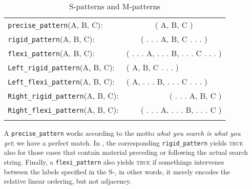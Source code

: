 \documentclass[output=paper,colorlinks,citecolor=brown,draft]{langscibook}
\begin{document}
\begin{table}
\caption{S-patterns and M-patterns }
\label{tab:SM}
 \begin{tabularx}{.9\textwidth}{ l c  }
  \lsptoprule

      {\texttt{precise\_pattern}({\color{red}A, B, C})}:\hspace{22mm} & {( {\color{blue} A, B, C} )} \\

      {\texttt{rigid\_pattern}({\color{red}A, B, C})}: & {( {\color{blue} {\color{gray}. . .  }A, B, C {\color{gray} . . .} })} \\
      
     {\texttt{flexi\_pattern}({\color{red}A, B, C}):} & {( {\color{blue} {\color{gray}. . .  }A, {\color{gray}. . .  }B, {\color{gray}. . .  }C {\color{gray}  . . .} })} \\


     {\texttt{Left\_rigid\_pattern}({\color{red}A, B, C}):} & \multicolumn{1}{l}{{( {\color{blue}  A, B, C {\color{gray} . . .}} )}} \\

    {\texttt{Left\_flexi\_pattern}({\color{red}A, B, C}):} & \multicolumn{1}{l}{{( {\color{blue}  A, {\color{gray}. . .  }B, {\color{gray}. . .  }C {\color{gray}  . . .}} )}}   \\

    {\texttt{Right\_rigid\_pattern}({\color{red}A, B, C}):} & \multicolumn{1}{r}{{( {\color{blue} {\color{gray}. . .  }A, B, C} ) }} \\
    
    {\texttt{Right\_flexi\_pattern}({\color{red}A, B, C}):} & \multicolumn{1}{r}{{( {\color{blue} {\color{gray}. . .  }A, {\color{gray}. . . }B, {\color{gray}. . .  } C} )}} \\
    
   \lspbottomrule
 \end{tabularx}
\end{table} 


A \texttt{precise\_pattern} works according to the motto \textit{what you search is what you get}; we have a perfect match.   
In , the corresponding \texttt{rigid\_pattern} yields \textsc{true} also for those cases that contain material preceding or following the actual search string. 
Finally, a \texttt{flexi\_pattern} also yields \textsc{true} if somethings intervenes between the labels specified in the S-, in other words, it merely encodes the relative linear ordering, but not adjacency. 
\end{document}
